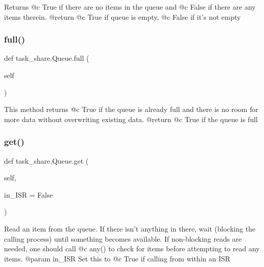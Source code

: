 \begin{DoxyVerb}Returns @c True if there are no items in the queue and @c False if 
there are any items therein.
@return @c True if queue is empty, @c False if it's not empty \end{DoxyVerb}
 \mbox{\label{classtask__share_1_1_queue_a0482d70ce6405fd8d85628b5cf95d471}} 
\subsubsection{\texorpdfstring{full()}{full()}}
{\footnotesize\ttfamily def task\+\_\+share.\+Queue.\+full (\begin{DoxyParamCaption}\item[{}]{self }\end{DoxyParamCaption})}

\begin{DoxyVerb}This method returns @c True if the queue is already full and there
is no room for more data without overwriting existing data. 
@return @c True if the queue is full \end{DoxyVerb}
 \mbox{\label{classtask__share_1_1_queue_af2aef1dd3eed21c4b6c2e601cb8497d4}} 
\subsubsection{\texorpdfstring{get()}{get()}}
{\footnotesize\ttfamily def task\+\_\+share.\+Queue.\+get (\begin{DoxyParamCaption}\item[{}]{self,  }\item[{}]{in\+\_\+\+I\+SR = {\ttfamily False} }\end{DoxyParamCaption})}

\begin{DoxyVerb}Read an item from the queue. If there isn't anything in there,
wait (blocking the calling process) until something becomes
available. If non-blocking reads are needed, one should call @c any()
to check for items before attempting to read any items.
@param in_ISR Set this to @c True if calling from within an ISR \end{DoxyVerb}
 \mbox{\label{classtask__share_1_1_queue_a713321bacac5d93ecf89c4be1c15fe30}} 
